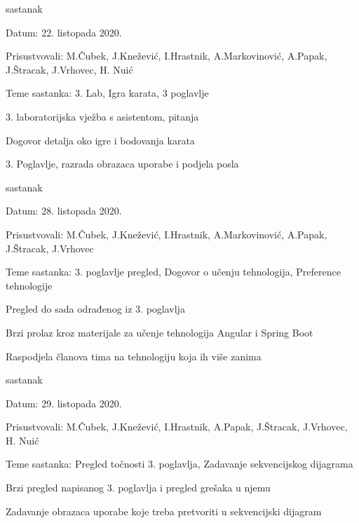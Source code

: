\begin{packed_enum}
			\item  sastanak
			\item[] \begin{packed_item}
				\item Datum: 22. listopada 2020.
				\item Prisustvovali: M.Čubek, J.Knežević, I.Hrastnik, A.Markovinović, A.Papak, J.Štracak, J.Vrhovec, H. Nuić
				\item Teme sastanka: 3. Lab, Igra karata, 3 poglavlje
				\begin{packed_item}
					\item 3. laboratorijska vježba s asistentom, pitanja
					\item Dogovor detalja oko igre i bodovanja karata
					\item 3. Poglavlje, razrada obrazaca uporabe i podjela posla
				\end{packed_item}
			\end{packed_item}
		
			\item  sastanak
			\item[] \begin{packed_item}
				\item Datum: 28. listopada 2020.
				\item Prisustvovali: M.Čubek, J.Knežević, I.Hrastnik, A.Markovinović, A.Papak, J.Štracak, J.Vrhovec
				\item Teme sastanka: 3. poglavlje pregled, Dogovor o učenju tehnologija, Preference tehnologije
				\begin{packed_item}
					\item Pregled do sada odrađenog iz 3. poglavlja
					\item Brzi prolaz kroz materijale za učenje tehnologija Angular i Spring Boot
					\item Raspodjela članova tima na tehnologiju koja ih više zanima
				\end{packed_item}
			\end{packed_item}
		
			\item  sastanak
			\item[] \begin{packed_item}
				\item Datum: 29. listopada 2020.
				\item Prisustvovali: M.Čubek, J.Knežević, I.Hrastnik, A.Papak, J.Štracak, J.Vrhovec, H. Nuić
				\item Teme sastanka: Pregled točnosti 3. poglavlja, Zadavanje sekvencijskog dijagrama
				\begin{packed_item}
					\item Brzi pregled napisanog 3. poglavlja i pregled grešaka u njemu
					\item Zadavanje obrazaca uporabe koje treba pretvoriti u sekvencijski dijagram
				\end{packed_item}
			\end{packed_item}
		

\end{packed_enum}
